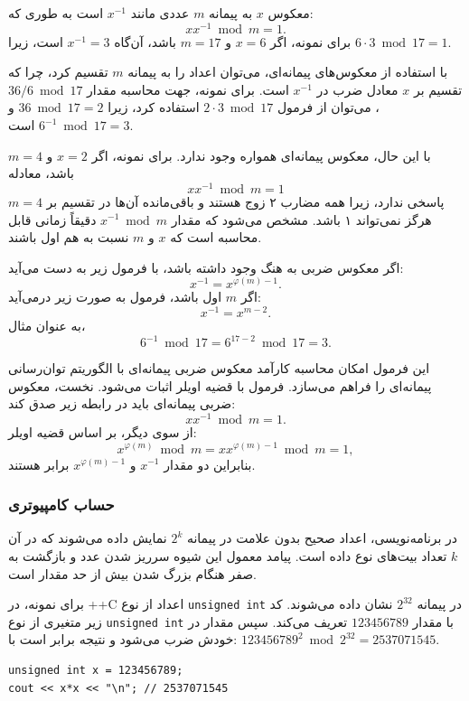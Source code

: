 
معکوس $x$ به پیمانه $m$
عددی مانند $x^{-1}$ است به طوری که:
\[ x x^{-1} \bmod m = 1. \]
برای نمونه، اگر $x=6$ و $m=17$ باشد،
آن‌گاه $x^{-1}=3$ است، زیرا $6\cdot3 \bmod 17=1$.

با استفاده از معکوس‌های پیمانه‌ای، می‌توان اعداد را
به پیمانه $m$ تقسیم کرد، چرا که تقسیم بر $x$
معادل ضرب در $x^{-1}$ است.
برای نمونه، جهت محاسبه مقدار $36/6 \bmod 17$،
می‌توان از فرمول $2 \cdot 3 \bmod 17$ استفاده کرد،
زیرا $36 \bmod 17 = 2$ و $6^{-1} \bmod 17 = 3$ است.

با این حال، معکوس پیمانه‌ای همواره وجود ندارد.
برای نمونه، اگر $x=2$ و $m=4$ باشد، معادله
\[ x x^{-1} \bmod m = 1 \]
پاسخی ندارد، زیرا همه مضارب ۲ زوج هستند
و باقی‌مانده آن‌ها در تقسیم بر $m=4$ هرگز نمی‌تواند ۱ باشد.
مشخص می‌شود که مقدار $x^{-1} \bmod m$
دقیقاً زمانی قابل محاسبه است که $x$ و $m$ نسبت به هم اول باشند.

اگر معکوس ضربی به هنگ وجود داشته باشد، با فرمول زیر به دست می‌آید:
\[
x^{-1} = x^{\varphi(m)-1}.
\]
اگر $m$ اول باشد، فرمول به صورت زیر درمی‌آید:
\[
x^{-1} = x^{m-2}.
\]
به عنوان مثال،
\[6^{-1} \bmod 17 =6^{17-2} \bmod 17 = 3.\]

این فرمول امکان محاسبه کارآمد معکوس ضربی پیمانه‌ای با الگوریتم توان‌رسانی پیمانه‌ای را فراهم می‌سازد.
فرمول با قضیه اویلر اثبات می‌شود.
نخست، معکوس ضربی پیمانه‌ای باید در رابطه زیر صدق کند:
\[
x x^{-1} \bmod m = 1.
\]
از سوی دیگر، بر اساس قضیه اویلر:
\[
x^{\varphi(m)} \bmod m =  xx^{\varphi(m)-1} \bmod m = 1,
\]
بنابراین دو مقدار $x^{-1}$ و $x^{\varphi(m)-1}$ برابر هستند.

\subsubsection{حساب کامپیوتری}

در برنامه‌نویسی، اعداد صحیح بدون علامت در پیمانه $2^k$ نمایش داده می‌شوند که در آن $k$ تعداد بیت‌های نوع داده است.
پیامد معمول این شیوه سرریز شدن عدد و بازگشت به صفر هنگام بزرگ شدن بیش از حد مقدار است.

برای نمونه، در ++C اعداد از نوع \texttt{unsigned int}
در پیمانه $2^{32}$ نشان داده می‌شوند.
کد زیر متغیری از نوع \texttt{unsigned int}
با مقدار $123456789$ تعریف می‌کند.
سپس مقدار در خودش ضرب می‌شود
و نتیجه برابر است با:
$123456789^2 \bmod 2^{32} = 2537071545$.

\begin{lstlisting}
unsigned int x = 123456789;
cout << x*x << "\n"; // 2537071545
\end{lstlisting}

